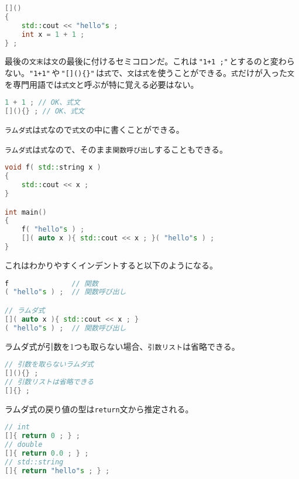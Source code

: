 \begin{lstlisting}[language={C++}]
[]()
{
    std::cout << "hello"s ;
    int x = 1 + 1 ;
} ;
\end{lstlisting}

最後の\texttt{文末}は\texttt{文}の最後に付けるセミコロンだ。これは\,\texttt{"1+1 ;"}\,とするのと変わらない。\texttt{"1+1"}\,や\,\texttt{"[]()\{\}"}\,は\texttt{式}で、\texttt{文}は\texttt{式}を使うことができる。\texttt{式}だけが入った\texttt{文}を専門用語では\texttt{式文}と呼ぶが特に覚える必要はない。

\begin{lstlisting}[language={C++}]
1 + 1 ; // OK、式文
[](){} ; // OK、式文
\end{lstlisting}

\texttt{ラムダ式}は\texttt{式}なので\texttt{式文}の中に書くことができる。

\texttt{ラムダ式}は\texttt{式}なので、そのまま\texttt{関数呼び出し}することもできる。

\begin{lstlisting}[language={C++}]
void f( std::string x )
{
    std::cout << x ;
}

int main()
{
    f( "hello"s ) ;
    []( auto x ){ std::cout << x ; }( "hello"s ) ;
}
\end{lstlisting}

これはわかりやすくインデントすると以下のようになる。

\begin{lstlisting}[language={C++}]
f               // 関数
( "hello"s ) ;  // 関数呼び出し

// ラムダ式
[]( auto x ){ std::cout << x ; }
( "hello"s ) ;  // 関数呼び出し
\end{lstlisting}

ラムダ式が引数を1つも取らない場合、\texttt{引数リスト}は省略できる。

\begin{lstlisting}[language={C++}]
// 引数を取らないラムダ式
[](){} ;
// 引数リストは省略できる
[]{} ;
\end{lstlisting}

ラムダ式の戻り値の型は\texttt{return}文から推定される。

\begin{lstlisting}[language={C++}]
// int
[]{ return 0 ; } ;
// double
[]{ return 0.0 ; } ;
// std::string
[]{ return "hello"s ; } ;
\end{lstlisting}

